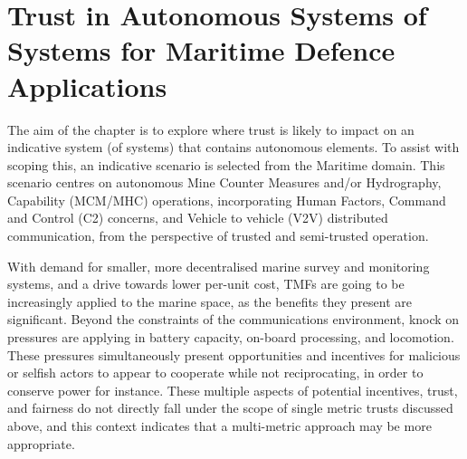 \def\ChapterTitle{Trust in Autonomous Systems of Systems for Maritime Defence Applications}

\ifx\ifthesis\undefined

\else
\chapter{\ChapterTitle}
\label{Chapter\thechapter}
\fi

The aim of the chapter is to explore where trust is likely to impact on an indicative system (of systems) that contains autonomous elements.
To assist with scoping this, an indicative scenario is selected from the Maritime domain.  This scenario centres on autonomous Mine Counter  Measures and/or Hydrography, Capability (MCM/MHC) operations, incorporating Human Factors, Command and Control (C2) concerns, and Vehicle to vehicle (V2V) distributed communication, from the perspective of trusted and semi-trusted operation. 

With demand for smaller, more decentralised marine survey and monitoring systems, and a drive towards lower per-unit cost, TMFs are going to be increasingly applied to the marine space, as the benefits they present are significant.
Beyond the constraints of the communications environment, knock on pressures are applying in battery capacity, on-board processing, and locomotion.
These pressures simultaneously present opportunities and incentives for malicious or selfish actors to appear to cooperate while not reciprocating, in order to conserve power for instance.
These multiple aspects of potential incentives, trust, and fairness do not directly fall under the scope of single metric trusts discussed above, and this context indicates that a multi-metric approach may be more appropriate.


